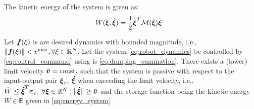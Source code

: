 The kinetic energy of the system is given as:
\begin{equation}
	W(\vecs \xi, \vecs{\dot \xi}) = \frac{1}{2}  \dot{\vecs{\xi}}^T \matd{M}(\vecs \xi) \dot{\vecs{\xi}} \label{eq:energy_system}
\end{equation}

\begin{theorem}\label{theorem:passivity}
  Let $\boldsymbol{f}(\xi)$ is are desired dynamics with bounded magnitude, i.e., $\| \boldsymbol{f}(\xi) \| < v^{\mathrm{max}}, \forall \xi \in \mathbb{R}^N$.
  Let the system \eqref{eq:robot_dynamics} be controlled by \eqref{eq:control_command} using is \eqref{eq:damping_summation}.
  There exists a (lower) limit velocity $\boldsymbol{\bar v} = \text{const.}$ such that the system is passive with respect to the input-output pair $\boldsymbol{\xi}_e$, $\boldsymbol{\dot \xi}$ when exceeding the limit velocity, i.e., $\dot{W} \leq \boldsymbol{\dot \xi}^T \boldsymbol{\tau}_e, \; \forall \boldsymbol{\xi} \in \mathbb{R}^N: \| \boldsymbol{\dot \xi} \| \geq \boldsymbol{\bar v}$ and the storage function being the kinetic energy $W \in \mathbb{R}$ given in \eqref{eq:energy_system}
\end{theorem}
  
